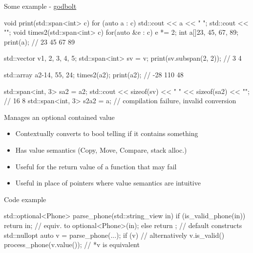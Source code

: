 \begin{frame}[fragile]
  \begin{exampleblock}{Some example - \href{https://godbolt.org/z/W81sjrbxK}{\color{blue!50!white} godbolt}}
    \scriptsize
    \begin{cppcode*}{}
      void print(std::span<int> c) {
        for (auto a : c) { std::cout << a << " "; }
        std::cout << "\n";
      }
      void times2(std::span<int> c) {
        for(auto &e : c) { e *= 2; }
      }
      int a[]{23, 45, 67, 89};
      print(a);                 // 23 45 67 89

      std::vector v{1, 2, 3, 4, 5};
      std::span<int> sv = v;
      print(sv.subspan(2, 2));  // 3 4

      std::array a2{-14, 55, 24};
      times2(a2);
      print(a2);                // -28 110 48

      std::span<int, 3> sa2 = a2;
      std::cout << sizeof(sv) << " " << sizeof(sa2) << "\n";  // 16 8
      std::span<int, 3> s2a2 = a; // compilation failure, invalid conversion
    \end{cppcode*}
  \end{exampleblock}
\end{frame}

\begin{frame}[fragile]
  \begin{block}{Manages an optional contained value}
    \begin{itemize}
    \item Contextually converts to bool telling if it contains something
    \item Has value semantics (Copy, Move, Compare, stack alloc.)
    \item Useful for the return value of a function that may fail
    \item Useful in place of pointers where value semantics are intuitive
    \end{itemize}
  \end{block}
  \begin{exampleblock}{Code example}
    \small
    \begin{cppcode*}{}
      std::optional<Phone> parse_phone(std::string_view in) {
        if (is_valid_phone(in))
          return in;   // equiv. to optional<Phone>(in);
        else
          return {};   // default constructs std::nullopt
      }
      auto v = parse_phone(...);
      if (v) {            // alternatively v.is_valid()
        process_phone(v.value()); // *v is equivalent
      }
    \end{cppcode*}
  \end{exampleblock}
\end{frame}

